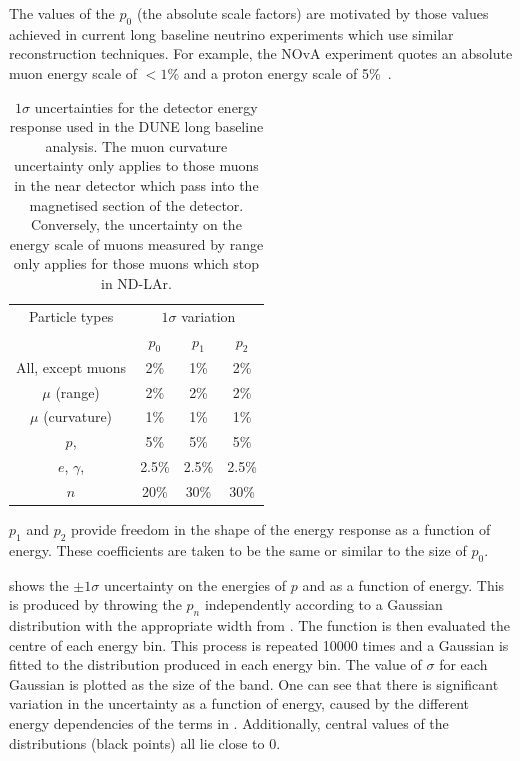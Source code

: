 The values of the $p_{0}$ (the absolute scale factors) are motivated by those values achieved in current long baseline neutrino experiments which use similar reconstruction techniques.
For example, the NOvA experiment quotes an absolute muon energy scale of $<1\%$ and a proton energy scale of 5\%~\cite{nova2018}.

\begin{table}
	\caption[$1\sigma$ uncertainties for the detector energy response used in the DUNE long baseline analysis]{$1\sigma$ uncertainties for the detector energy response used in the DUNE long baseline analysis. The muon curvature uncertainty only applies to those muons in the near detector which pass into the magnetised section of the detector. Conversely, the uncertainty on the energy scale of muons measured by range only applies for those muons which stop in ND-LAr.}
	\label{tab:energyScaleParams}
	\centering
	\begin{tabular}{c c c c}
		\hline
		\hline
		Particle types & \multicolumn{3}{c}{$1\sigma$ variation} \\
		& $p_{0}$ & $p_{1}$ & $p_{2}$ \\
		\hline
		All, except muons      & 2\%   & 1\%   & 2\%   \\
		$\mu$ (range)          & 2\%   & 2\%   & 2\%   \\
		$\mu$ (curvature)      & 1\%   & 1\%   & 1\%   \\
		$p$, \pipm             & 5\%   & 5\%   & 5\%   \\
		$e$, $\gamma$, \pizero & 2.5\% & 2.5\% & 2.5\% \\
		$n$                    & 20\%  & 30\%  & 30\% \\
		\hline
	\end{tabular}
\end{table}

$p_{1}$ and $p_{2}$ provide freedom in the shape of the energy response as a function of energy.
These coefficients are taken to be the same or similar to the size of $p_{0}$.

 shows the $\pm1\sigma$ uncertainty on the energies of $p$ and \pipm as a function of energy.
This is produced by throwing the $p_{n}$ independently according to a Gaussian distribution with the appropriate width from . The function is then evaluated the centre of each energy bin.
This process is repeated \num{10000} times and a Gaussian is fitted to the distribution produced in each energy bin.
The value of $\sigma$ for each Gaussian is plotted as the size of the band.
One can see that there is significant variation in the uncertainty as a function of energy, caused by the different energy dependencies of the terms in .
Additionally, central values of the distributions (black points) all lie close to 0.

